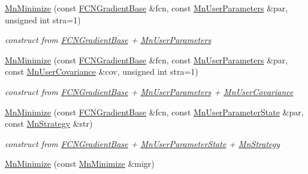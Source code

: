 \begin{DoxyCompactItemize}
\mbox{\hyperlink{classROOT_1_1Minuit2_1_1MnMinimize_a7ae2da481677eb3b7fcf3b77a8dee92b}{Mn\+Minimize}} (const \mbox{\hyperlink{classROOT_1_1Minuit2_1_1FCNGradientBase}{F\+C\+N\+Gradient\+Base}} \&fcn, const \mbox{\hyperlink{classROOT_1_1Minuit2_1_1MnUserParameters}{Mn\+User\+Parameters}} \&par, unsigned int stra=1)
\begin{DoxyCompactList}\small\item\em construct from \mbox{\hyperlink{classROOT_1_1Minuit2_1_1FCNGradientBase}{F\+C\+N\+Gradient\+Base}} + \mbox{\hyperlink{classROOT_1_1Minuit2_1_1MnUserParameters}{Mn\+User\+Parameters}} \end{DoxyCompactList}\item 
\mbox{\hyperlink{classROOT_1_1Minuit2_1_1MnMinimize_a669845a1aaba36456664f1e98a615e25}{Mn\+Minimize}} (const \mbox{\hyperlink{classROOT_1_1Minuit2_1_1FCNGradientBase}{F\+C\+N\+Gradient\+Base}} \&fcn, const \mbox{\hyperlink{classROOT_1_1Minuit2_1_1MnUserParameters}{Mn\+User\+Parameters}} \&par, const \mbox{\hyperlink{classROOT_1_1Minuit2_1_1MnUserCovariance}{Mn\+User\+Covariance}} \&cov, unsigned int stra=1)
\begin{DoxyCompactList}\small\item\em construct from \mbox{\hyperlink{classROOT_1_1Minuit2_1_1FCNGradientBase}{F\+C\+N\+Gradient\+Base}} + \mbox{\hyperlink{classROOT_1_1Minuit2_1_1MnUserParameters}{Mn\+User\+Parameters}} + \mbox{\hyperlink{classROOT_1_1Minuit2_1_1MnUserCovariance}{Mn\+User\+Covariance}} \end{DoxyCompactList}\item 
\mbox{\hyperlink{classROOT_1_1Minuit2_1_1MnMinimize_ae607cd588cff70b64c0705bb86a36ba0}{Mn\+Minimize}} (const \mbox{\hyperlink{classROOT_1_1Minuit2_1_1FCNGradientBase}{F\+C\+N\+Gradient\+Base}} \&fcn, const \mbox{\hyperlink{classROOT_1_1Minuit2_1_1MnUserParameterState}{Mn\+User\+Parameter\+State}} \&par, const \mbox{\hyperlink{classROOT_1_1Minuit2_1_1MnStrategy}{Mn\+Strategy}} \&str)
\begin{DoxyCompactList}\small\item\em construct from \mbox{\hyperlink{classROOT_1_1Minuit2_1_1FCNGradientBase}{F\+C\+N\+Gradient\+Base}} + \mbox{\hyperlink{classROOT_1_1Minuit2_1_1MnUserParameterState}{Mn\+User\+Parameter\+State}} + \mbox{\hyperlink{classROOT_1_1Minuit2_1_1MnStrategy}{Mn\+Strategy}} \end{DoxyCompactList}\item 
\mbox{\hyperlink{classROOT_1_1Minuit2_1_1MnMinimize_a5381e16cfd79c2b4da61e399a6a02b35}{Mn\+Minimize}} (const \mbox{\hyperlink{classROOT_1_1Minuit2_1_1MnMinimize}{Mn\+Minimize}} \&migr)

\end{DoxyCompactItemize}
